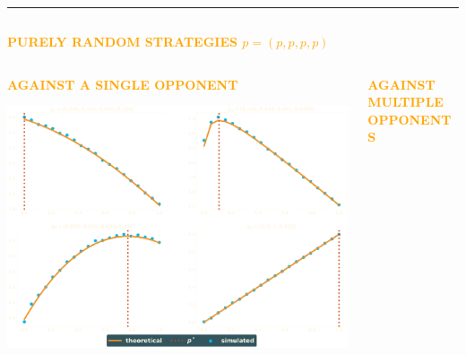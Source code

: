 \documentclass[usenames,dvipsnames,t]{beamer}
\begin{document}
\hrule height 3pt
\vspace{1cm}
\begin{columns}
    \begin{column}{.7\linewidth}
        \begin{center}
            \textcolor{orange}{\textbf{\Large{PURELY RANDOM STRATEGIES \(p=(p, p, p, p)\)}}}
        \end{center}

    \begin{columns}
        \begin{column}{.5\linewidth}
            \begin{center}
            \vspace{-1cm}

            \textcolor{orange}{\textbf{\small{AGAINST A SINGLE OPPONENT}}}
            \vspace{2cm}

            
            \vspace{2cm}

            \includegraphics[width=.7\textwidth]{static/matches}
            \end{center}
        \end{column}
        \begin{column}{.5\linewidth}
            \begin{center}
                \vspace{-1cm}
    
                \textcolor{orange}{\textbf{\small{AGAINST MULTIPLE OPPONENTS}}}
                \vspace{2cm}
    
                
                \vspace{-.5cm}
                

\end{center}
\end{column}
\end{columns}
\end{column}
\end{columns}
\end{document}
